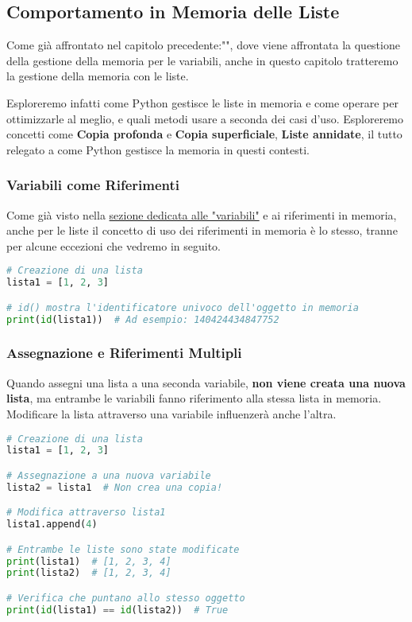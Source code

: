 \clearpage

\subsection{Comportamento in Memoria delle Liste}\label{ComportamentoInMemoriaListe}

Come già affrontato nel capitolo precedente:"", dove viene affrontata la questione della gestione della memoria per le variabili, anche in questo capitolo tratteremo la gestione della memoria con le liste.
\newline


Esploreremo infatti come Python gestisce le liste in memoria e come operare per ottimizzarle al meglio, e quali metodi usare a seconda dei casi d'uso.
Esploreremo concetti come \textbf{Copia profonda} e \textbf{Copia superficiale}, \textbf{Liste annidate}, il tutto relegato a come Python gestisce la memoria in questi contesti.

\vspace{0.3cm}
\subsubsection{Variabili come Riferimenti}

Come già visto nella \hyperref[variabiliMemoria]{sezione dedicata alle "variabili"} e ai riferimenti in memoria, anche per le liste il concetto di uso dei riferimenti in memoria è lo stesso, tranne per alcune eccezioni che vedremo in seguito.



\begin{lstlisting}[language=Python]
# Creazione di una lista
lista1 = [1, 2, 3]

# id() mostra l'identificatore univoco dell'oggetto in memoria
print(id(lista1))  # Ad esempio: 140424434847752
\end{lstlisting}

\subsubsection{Assegnazione e Riferimenti Multipli}

Quando assegni una lista a una seconda variabile, \textbf{non viene creata una nuova lista}, ma entrambe le variabili fanno riferimento alla stessa lista in memoria. Modificare la lista attraverso una variabile influenzerà anche l'altra.

\begin{lstlisting}[language=Python]
# Creazione di una lista
lista1 = [1, 2, 3]

# Assegnazione a una nuova variabile
lista2 = lista1  # Non crea una copia!

# Modifica attraverso lista1
lista1.append(4)

# Entrambe le liste sono state modificate
print(lista1)  # [1, 2, 3, 4]
print(lista2)  # [1, 2, 3, 4]

# Verifica che puntano allo stesso oggetto
print(id(lista1) == id(lista2))  # True
\end{lstlisting}

